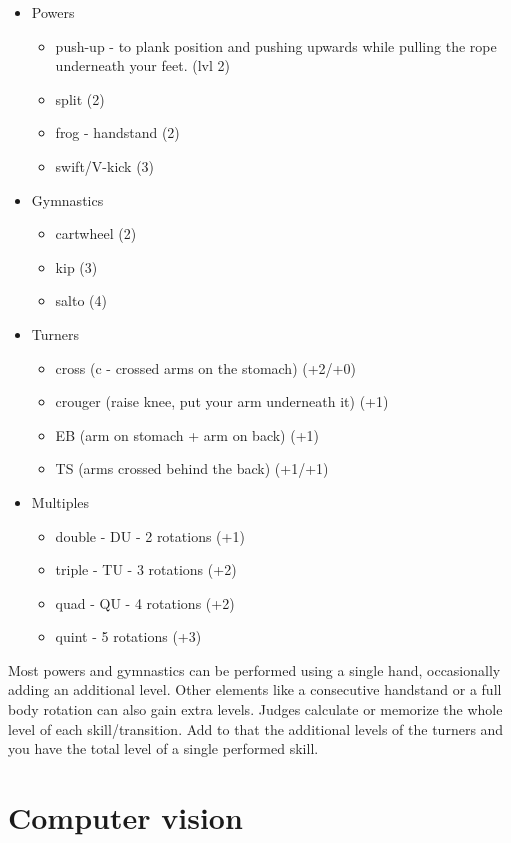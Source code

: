 \begin{itemize}
    \item Powers
    \begin{itemize}
        \item push-up - to plank position and pushing upwards while pulling the rope underneath your feet. (lvl 2)
        \item split (2)
        \item frog - handstand (2)
        \item swift/V-kick (3)
    \end{itemize}
    \item Gymnastics
    \begin{itemize}
        \item cartwheel (2)
        \item kip (3)
        \item salto (4)
    \end{itemize}
    \item Turners
    \begin{itemize}
        \item cross (c - crossed arms on the stomach) (+2/+0)
        \item crouger (raise knee, put your arm underneath it) (+1)
        \item EB (arm on stomach + arm on back) (+1)
        \item TS (arms crossed behind the back) (+1/+1)
    \end{itemize}
    \item Multiples
    \begin{itemize}
        \item double - DU - 2 rotations (+1)
        \item triple - TU - 3 rotations (+2)
        \item quad - QU - 4 rotations (+2)
        \item quint - 5 rotations (+3)
    \end{itemize}
\end{itemize}

Most powers and gymnastics can be performed using a single hand, occasionally adding an additional level. Other elements like a consecutive handstand or a full body rotation can also gain extra levels. Judges calculate or memorize the whole level of each skill/transition. Add to that the additional levels of the turners and you have the total level of a single performed skill.

\section{Computer vision}
\label{subsec:bp-literature-computer-vision}

